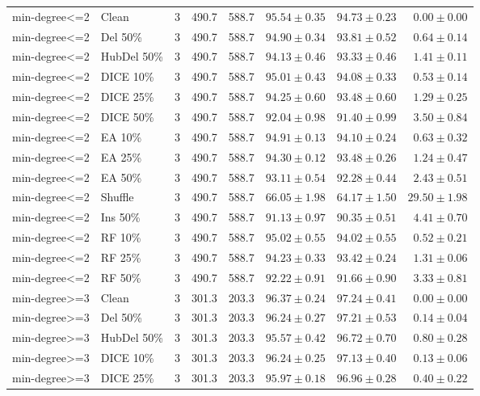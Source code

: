 {\begin{longtable}{llrrrrrr}
min-degree<=2 & Clean & 3 & 490.7 & 588.7 & $95.54\pm0.35$ & $94.73\pm0.23$ & $0.00\pm0.00$ \\
min-degree<=2 & Del 50\% & 3 & 490.7 & 588.7 & $94.90\pm0.34$ & $93.81\pm0.52$ & $0.64\pm0.14$ \\
min-degree<=2 & HubDel 50\% & 3 & 490.7 & 588.7 & $94.13\pm0.46$ & $93.33\pm0.46$ & $1.41\pm0.11$ \\
min-degree<=2 & DICE 10\% & 3 & 490.7 & 588.7 & $95.01\pm0.43$ & $94.08\pm0.33$ & $0.53\pm0.14$ \\
min-degree<=2 & DICE 25\% & 3 & 490.7 & 588.7 & $94.25\pm0.60$ & $93.48\pm0.60$ & $1.29\pm0.25$ \\
min-degree<=2 & DICE 50\% & 3 & 490.7 & 588.7 & $92.04\pm0.98$ & $91.40\pm0.99$ & $3.50\pm0.84$ \\
min-degree<=2 & EA 10\% & 3 & 490.7 & 588.7 & $94.91\pm0.13$ & $94.10\pm0.24$ & $0.63\pm0.32$ \\
min-degree<=2 & EA 25\% & 3 & 490.7 & 588.7 & $94.30\pm0.12$ & $93.48\pm0.26$ & $1.24\pm0.47$ \\
min-degree<=2 & EA 50\% & 3 & 490.7 & 588.7 & $93.11\pm0.54$ & $92.28\pm0.44$ & $2.43\pm0.51$ \\
min-degree<=2 & Shuffle & 3 & 490.7 & 588.7 & $66.05\pm1.98$ & $64.17\pm1.50$ & $29.50\pm1.98$ \\
min-degree<=2 & Ins 50\% & 3 & 490.7 & 588.7 & $91.13\pm0.97$ & $90.35\pm0.51$ & $4.41\pm0.70$ \\
min-degree<=2 & RF 10\% & 3 & 490.7 & 588.7 & $95.02\pm0.55$ & $94.02\pm0.55$ & $0.52\pm0.21$ \\
min-degree<=2 & RF 25\% & 3 & 490.7 & 588.7 & $94.23\pm0.33$ & $93.42\pm0.24$ & $1.31\pm0.06$ \\
min-degree<=2 & RF 50\% & 3 & 490.7 & 588.7 & $92.22\pm0.91$ & $91.66\pm0.90$ & $3.33\pm0.81$ \\
min-degree>=3 & Clean & 3 & 301.3 & 203.3 & $96.37\pm0.24$ & $97.24\pm0.41$ & $0.00\pm0.00$ \\
min-degree>=3 & Del 50\% & 3 & 301.3 & 203.3 & $96.24\pm0.27$ & $97.21\pm0.53$ & $0.14\pm0.04$ \\
min-degree>=3 & HubDel 50\% & 3 & 301.3 & 203.3 & $95.57\pm0.42$ & $96.72\pm0.70$ & $0.80\pm0.28$ \\
min-degree>=3 & DICE 10\% & 3 & 301.3 & 203.3 & $96.24\pm0.25$ & $97.13\pm0.40$ & $0.13\pm0.06$ \\
min-degree>=3 & DICE 25\% & 3 & 301.3 & 203.3 & $95.97\pm0.18$ & $96.96\pm0.28$ & $0.40\pm0.22$ \\

\end{longtable}}
